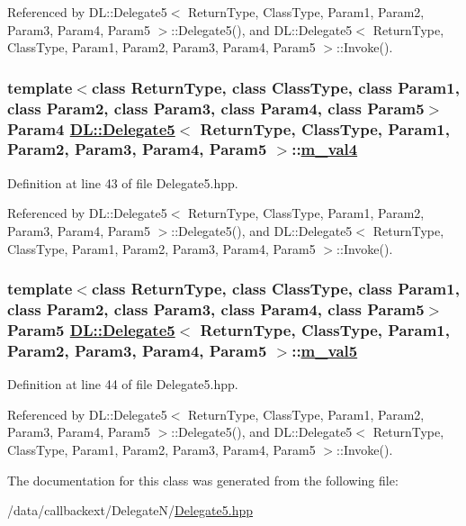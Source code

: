 Referenced by DL::Delegate5$<$ Return\-Type, Class\-Type, Param1, Param2, Param3, Param4, Param5 $>$::Delegate5(), and DL::Delegate5$<$ Return\-Type, Class\-Type, Param1, Param2, Param3, Param4, Param5 $>$::Invoke().\hypertarget{classDL_1_1Delegate5_r5}{
\subsubsection[m\_\-val4]{\setlength{\rightskip}{0pt plus 5cm}template$<$class Return\-Type, class Class\-Type, class Param1, class Param2, class Param3, class Param4, class Param5$>$ Param4 \hyperlink{classDL_1_1Delegate5}{DL::Delegate5}$<$ Return\-Type, Class\-Type, Param1, Param2, Param3, Param4, Param5 $>$::\hyperlink{classDL_1_1Delegate5_r5}{m\_\-val4}}}
\label{classDL_1_1Delegate5_r5}




Definition at line 43 of file Delegate5.hpp.

Referenced by DL::Delegate5$<$ Return\-Type, Class\-Type, Param1, Param2, Param3, Param4, Param5 $>$::Delegate5(), and DL::Delegate5$<$ Return\-Type, Class\-Type, Param1, Param2, Param3, Param4, Param5 $>$::Invoke().\hypertarget{classDL_1_1Delegate5_r6}{
\subsubsection[m\_\-val5]{\setlength{\rightskip}{0pt plus 5cm}template$<$class Return\-Type, class Class\-Type, class Param1, class Param2, class Param3, class Param4, class Param5$>$ Param5 \hyperlink{classDL_1_1Delegate5}{DL::Delegate5}$<$ Return\-Type, Class\-Type, Param1, Param2, Param3, Param4, Param5 $>$::\hyperlink{classDL_1_1Delegate5_r6}{m\_\-val5}}}
\label{classDL_1_1Delegate5_r6}




Definition at line 44 of file Delegate5.hpp.

Referenced by DL::Delegate5$<$ Return\-Type, Class\-Type, Param1, Param2, Param3, Param4, Param5 $>$::Delegate5(), and DL::Delegate5$<$ Return\-Type, Class\-Type, Param1, Param2, Param3, Param4, Param5 $>$::Invoke().

The documentation for this class was generated from the following file:\begin{CompactItemize}
\item 
/data/callbackext/Delegate\-N/\hyperlink{Delegate5_8hpp}{Delegate5.hpp}\end{CompactItemize}
